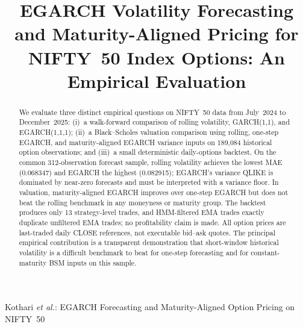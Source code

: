 \documentclass[journal]{IEEEtran}
\begin{document}
\title{EGARCH Volatility Forecasting and Maturity-Aligned Pricing for NIFTY~50 Index Options: An Empirical Evaluation}

\author{
\IEEEauthorblockA{}
}

\markboth{}%
{Kothari \MakeLowercase{\textit{et al.}}: EGARCH Forecasting and Maturity-Aligned Option Pricing on NIFTY~50}

\maketitle

\begin{abstract}
We evaluate three distinct empirical questions on NIFTY~50 data from July~2024 to December~2025: (i)~a walk-forward comparison of rolling volatility, GARCH(1,1), and EGARCH(1,1,1); (ii)~a Black--Scholes valuation comparison using rolling, one-step EGARCH, and maturity-aligned EGARCH variance inputs on 189{,}084 historical option observations; and (iii)~a small deterministic daily-options backtest. On the common 312-observation forecast sample, rolling volatility achieves the lowest MAE (0.068347) and EGARCH the highest (0.082915); EGARCH's variance QLIKE is dominated by near-zero forecasts and must be interpreted with a variance floor. In valuation, maturity-aligned EGARCH improves over one-step EGARCH but does not beat the rolling benchmark in any moneyness or maturity group. The backtest produces only 13 strategy-level trades, and HMM-filtered EMA trades exactly duplicate unfiltered EMA trades; no profitability claim is made. All option prices are last-traded daily CLOSE references, not executable bid--ask quotes. The principal empirical contribution is a transparent demonstration that short-window historical volatility is a difficult benchmark to beat for one-step forecasting and for constant-maturity BSM inputs on this sample.
\end{abstract}
\end{document}
